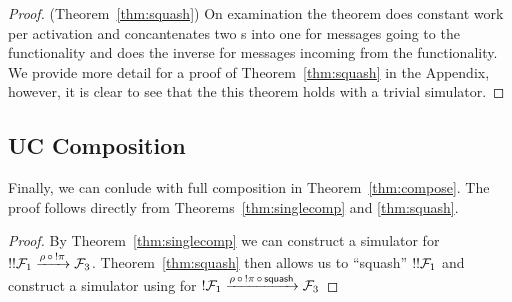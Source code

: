 \begin{proof} (Theorem~\ref{thm:squash})
On examination the  theorem does constant work per activation and concantenates two s into one for messages going to the functionality and does the inverse for messages incoming from the functionality.
We provide more detail for a proof of Theorem~\ref{thm:squash} in the Appendix, however, it is clear to see that the this theorem holds with a trivial simulator.
%
%
%
\end{proof}

\subsection{UC Composition}
Finally, we can conlude with full composition in Theorem~\ref{thm:compose}.
The proof follows directly from Theorems~\ref{thm:singlecomp} and \ref{thm:squash}.

\begin{proof}
By Theorem~\ref{thm:singlecomp} we can construct a simulator  for $!!\mathcal{F}_1 \xrightarrow{\rho \, \circ \, !\pi} \mathcal{F}_3$.
Theorem~\ref{thm:squash} then allows us to ``squash'' $!!\mathcal{F}_1$ and construct a simulator using  for $!\mathcal{F}_1 \xrightarrow{\rho \, \circ \, !\pi \, \circ \, {\mathsf {squash}}} \mathcal{F}_3$
\end{proof}


